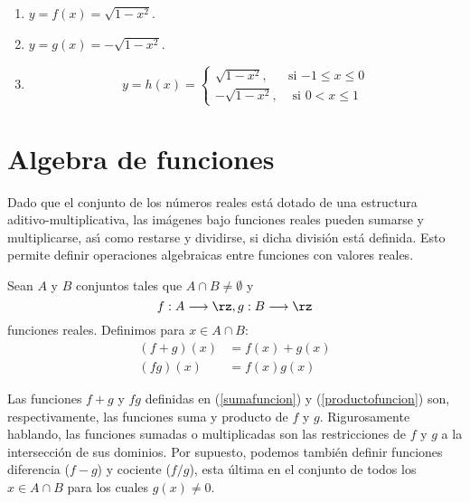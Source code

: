 \begin{enumerate}
\item $y=f(x)=\sqrt{1-x^{2}}$.

\item $y=g(x)=-\sqrt{1-x^{2}}$.

\item
\[
y=h(x)=%
\begin{cases}
\sqrt{1-x^{2}}, & \text{si $-1\leq x\leq0$}\\
-\sqrt{1-x^{2}}, & \text{ si $0<x\leq1$}%
\end{cases}
\]

\end{enumerate}

\section{Algebra de funciones}%

%
Dado que el conjunto de los n\'{u}meros reales est\'{a} dotado de una
estructura aditivo-multiplicativa, las im\'{a}genes bajo funciones reales
pueden sumarse y multiplicarse, as\'{\i} como restarse y dividirse, si dicha
divisi\'{o}n est\'{a} definida. Esto permite definir operaciones algebraicas
entre funciones con valores reales.

\begin{definition}
Sean $A$ y $B$ conjuntos tales que $A\cap B\neq\emptyset$ y
\[
f:A\longrightarrow\rz,g:B\longrightarrow\rz
\]
funciones reales. Definimos para $x\in A\cap B$:
\begin{align}
(f+g)(x)  &  =f(x)+g(x)\label{sumafuncion}\\
(fg)(x)  &  =f(x)g(x) \label{productofuncion}%
\end{align}

\end{definition}

Las funciones $f+g$ y $fg$ definidas en (\ref{sumafuncion}) y
(\ref{productofuncion}) son, respectivamente, las funciones
%
suma y producto%
de $f$ y $g$. Rigurosamente hablando, las funciones sumadas o multiplicadas
son las restricciones de $f$ y $g$ a la intersecci\'{o}n de sus dominios. Por
supuesto, podemos tambi\'{e}n definir funciones
%
diferencia%
($f-g$) y cociente ($f/g$), esta \'{u}ltima en el conjunto de todos los $x\in
A\cap B$ para los cuales $g(x)\neq0$.

